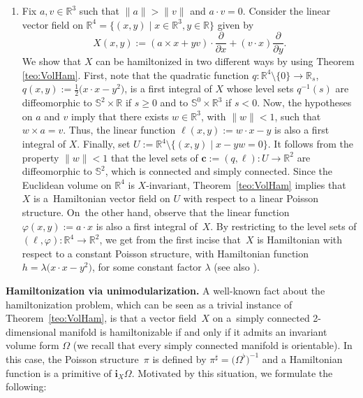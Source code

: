 \documentclass[pdftex]{sigma}%
\newcommand{\R}[1]{\mathbb{R}^{#1}}
\newcommand{\ii}{\mathbf{i}}
\numberwithin{equation}{section}
\begin{document}
\begin{Example}
\begin{enumerate}
 \item Fix $a,v \in \R{3}$ such that $\|a\| > \|v\|$ and $a \cdot v=0$. Consider the linear vector field on $\R{4}=\big\{(x,y) \mid x \in \R{3}, y \in \mathbb{R}\big\}$ given by
 \begin{equation*}
 X(x,y) := (a \times x + yv)\cdot\frac{\partial}{\partial x}+(v\cdot x)\frac{\partial}{\partial y}.
 \end{equation*}
 We show that $X$ can be hamiltonized in two different ways by using Theorem \ref{teo:VolHam}. First, note that the quadratic function $q\colon \R{4} \setminus \{0\} \to \mathbb{R}_{s}$, $q(x,y) := \tfrac{1}{2}\big(x\cdot x - y^2\big)$, is a first integral of $X$ whose level sets $q^{-1}(s)$ are diffeomorphic to $\mathbb{S}^2 \times \mathbb{R}$ if $s \geq 0$ and to $\mathbb{S}^{0} \times \R{3}$ if $s < 0$. Now, the hypotheses on $a$ and $v$ imply that there exists $w \in \R{3}$, with $\|w\| < 1$, such that $w \times a = v$. Thus, the linear function $\ell(x,y) := w \cdot x - y$ is also a first integral of $X$. Finally, set $U:=\R{4} \setminus \{(x,y) \mid x - yw = 0 \}$. It follows from the property $\|w\| < 1$ that the level sets of $\boldsymbol{c}:=(q,\ell)\colon U \to \R{2}$ are diffeomorphic to $\mathbb{S}^2$, which is connected and simply connected. Since the Euclidean volume on $\R{4}$ is $X$-invariant, Theorem~\ref{teo:VolHam} implies that~$X$ is a~Hamiltonian vector field on $U$ with respect to a linear Poisson structure. On~the other hand, observe that the linear function $\varphi(x,y) := a\cdot x$ is also a first integral of~$X$. By restricting to the level sets of $(\ell,\varphi)\colon \R{4} \to \R{2}$, we get from the first incise that~$X$ is Hamiltonian with respect to a constant Poisson structure, with Hamiltonian function $h = \lambda\big(x\cdot x-y^2\big)$, for some constant factor $\lambda$ (see also \cite[Theorem 2]{Kozlov-92}).
 \end{enumerate}
\end{Example}

{\bf Hamiltonization via unimodularization.} A well-known fact about the hamiltonization problem, which can be seen as a trivial instance of Theorem~\ref{teo:VolHam}, is that a vector field~$X$ on a~simply connected 2-dimensional manifold is hamiltonizable if and only if it admits an invariant volume form $\Omega$ (we recall that every simply connected manifold is orientable). In this case, the Poisson structure~$\pi$ is defined by $\pi^{\sharp} = \big(\Omega^{\flat}\big)^{-1}$ and a Hamiltonian function is a primitive of $\ii_{X}\Omega$. Motivated by this situation, we formulate the following:
\end{document}
